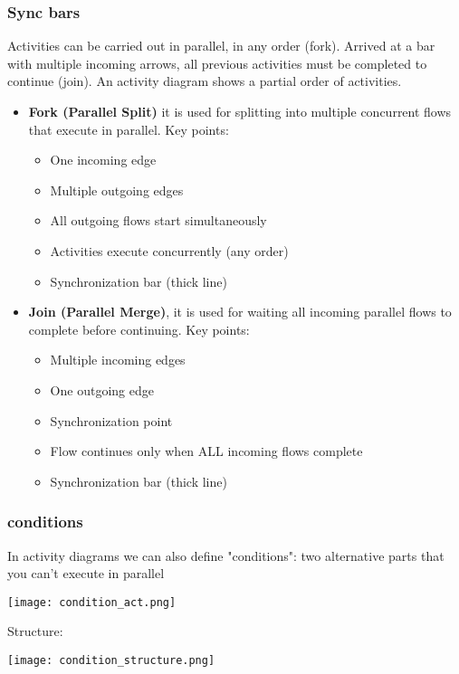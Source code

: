 \subsubsection{Sync bars}
    Activities can be carried out in parallel, in any order (fork). Arrived at a bar
with multiple incoming arrows, all previous activities must be completed to continue (join).
An activity diagram shows a partial order of activities.
    \begin{itemize}
        \item \textbf{Fork (Parallel Split)} it is used for splitting into multiple concurrent flows that execute in parallel. Key points:
        \begin{itemize}
            \item One incoming edge
            \item Multiple outgoing edges
            \item All outgoing flows start simultaneously
            \item Activities execute concurrently (any order)
            \item Synchronization bar (thick line)
        \end{itemize}
        \item \textbf{Join (Parallel Merge)}, it is used for waiting all incoming parallel flows to complete before continuing. Key points:
        \begin{itemize}
            \item Multiple incoming edges
            \item One outgoing edge
            \item Synchronization point
            \item Flow continues only when ALL incoming flows complete
            \item Synchronization bar (thick line)
        \end{itemize}
    \end{itemize}

\subsubsection{conditions}
In activity diagrams we can also define "conditions": two alternative parts that you can't execute in parallel
\begin{center}
    \texttt{[image: condition\_act.png]}
\end{center}

Structure:
\begin{center}
    \texttt{[image: condition\_structure.png]}
\end{center}



